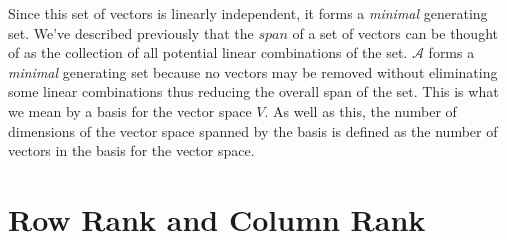 \documentclass[a4paper,12pt]{article}
\newcommand{\set}[1]{\mathcal{#1}}
\newcommand{\italic}[1]{\textit{#1}}
\begin{document}
	Since this set of vectors is linearly independent, it forms a \italic{minimal} generating set. We've described previously that the $ span $ of a set of vectors can be thought of as the collection of all potential linear combinations of the set. $ \set{A} $ forms a \italic{minimal} generating set because no vectors may be removed without eliminating some linear combinations thus reducing the overall span of the set. This is what we mean by a basis for the vector space $ V $. 
	As well as this, the number of dimensions of the vector space spanned by the basis is defined as the number of vectors in the basis for the vector space.
	\section{Row Rank and Column Rank}
	
\end{document}
